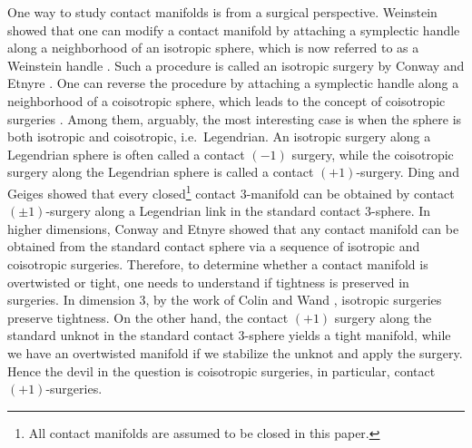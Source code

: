 \documentclass[reqno,11pt]{amsart}
\numberwithin{equation}{section}
\begin{document}
One way to study contact manifolds is from a surgical perspective. Weinstein \cite{zbMATH00011093} showed that one can modify a contact manifold by attaching a symplectic handle along a neighborhood of an isotropic sphere, which is now referred to as a Weinstein handle \cite{zbMATH06054083}. Such a procedure is called an isotropic surgery by Conway and Etnyre \cite{zbMATH07206659}. One can reverse the procedure by attaching a symplectic handle along a neighborhood of a coisotropic sphere, which leads to the concept of coisotropic surgeries \cite{zbMATH07206659}. Among them, arguably, the most interesting case is when the sphere is both isotropic and coisotropic, i.e.\ Legendrian. An isotropic surgery along a Legendrian sphere is often called a contact $(-1)$ surgery, while the coisotropic surgery along the Legendrian sphere is called a contact $(+1)$-surgery. Ding and Geiges \cite{zbMATH02103046} showed that every closed\footnote{All contact manifolds are assumed to be closed in this paper.} contact $3$-manifold can be obtained by contact $(\pm 1)$-surgery along a Legendrian link in the standard contact $3$-sphere. In higher dimensions, Conway and Etnyre \cite{zbMATH07206659} showed that any contact manifold can be obtained from the standard contact sphere via a sequence of isotropic and coisotropic surgeries. Therefore, to determine whether a contact manifold is overtwisted or tight, one needs to understand if tightness is preserved in surgeries. In dimension $3$, by the work of Colin \cite{MR1447038} and Wand \cite{zbMATH06487151}, isotropic surgeries preserve tightness. On the other hand, the contact $(+1)$ surgery along the standard unknot in the standard contact $3$-sphere yields a tight manifold, while we have an overtwisted manifold if we stabilize the unknot and apply the surgery. Hence the devil in the question is coisotropic surgeries, in particular, contact $(+1)$-surgeries.
\end{document}
